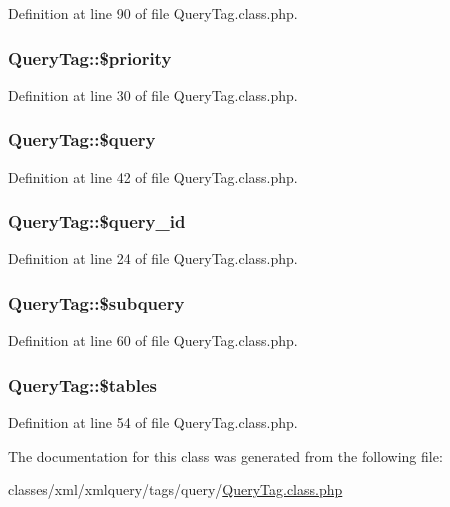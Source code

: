 Definition at line 90 of file Query\+Tag.\+class.\+php.

\hypertarget{classQueryTag_ac09e6c0124ba1d5945c7f93232e13827}{
\subsubsection[{\$priority}]{\setlength{\rightskip}{0pt plus 5cm}Query\+Tag\+::\$priority}}\label{classQueryTag_ac09e6c0124ba1d5945c7f93232e13827}


Definition at line 30 of file Query\+Tag.\+class.\+php.

\hypertarget{classQueryTag_a40fbf27ebaa31f5430080152164c3bae}{
\subsubsection[{\$query}]{\setlength{\rightskip}{0pt plus 5cm}Query\+Tag\+::\$query}}\label{classQueryTag_a40fbf27ebaa31f5430080152164c3bae}


Definition at line 42 of file Query\+Tag.\+class.\+php.

\hypertarget{classQueryTag_ac9ddaab237f51a26128e5f4d2869a430}{
\subsubsection[{\$query\+\_\+id}]{\setlength{\rightskip}{0pt plus 5cm}Query\+Tag\+::\$query\+\_\+id}}\label{classQueryTag_ac9ddaab237f51a26128e5f4d2869a430}


Definition at line 24 of file Query\+Tag.\+class.\+php.

\hypertarget{classQueryTag_a1fb40050f2484c2daa9e77cf53d11c15}{
\subsubsection[{\$subquery}]{\setlength{\rightskip}{0pt plus 5cm}Query\+Tag\+::\$subquery}}\label{classQueryTag_a1fb40050f2484c2daa9e77cf53d11c15}


Definition at line 60 of file Query\+Tag.\+class.\+php.

\hypertarget{classQueryTag_aed79c0c40d39fe9042ade3b23b6e172e}{
\subsubsection[{\$tables}]{\setlength{\rightskip}{0pt plus 5cm}Query\+Tag\+::\$tables}}\label{classQueryTag_aed79c0c40d39fe9042ade3b23b6e172e}


Definition at line 54 of file Query\+Tag.\+class.\+php.



The documentation for this class was generated from the following file\+:\begin{DoxyCompactItemize}
\item 
classes/xml/xmlquery/tags/query/\hyperlink{QueryTag_8class_8php}{Query\+Tag.\+class.\+php}\end{DoxyCompactItemize}
